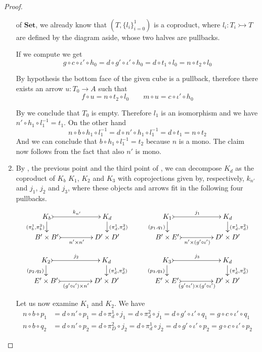 \documentclass[a4paper,UKenglish,cleveref,pdftex,thm-restate,numberwithinsect]{lipics-v2021}
\newcommand{\Set}{\mathbf{Set}}
\newcommand{\mto}{\rightarrowtail}
\begin{document}
\begin{proof}
\begin{enumerate}
		\noindent\parbox{9.5cm}{ of $\Set$, we already know that $(T, \{l_i\}_{i=0}^1)$ is a coproduct, where $l_i\colon T_i\mto T$ are defined by the diagram aside, whose two halves are pullbacks. }\hfill\parbox{4cm}{}
		
		If we compute we get
		\[g\circ c \circ \iota' \circ h_0=d\circ g'\circ \iota' \circ h_0=d\circ t_1\circ l_0=n\circ t_2\circ l_0\]
		
		By hypothesis the bottom face of the given cube is a pullback, therefore there exists an arrow $u\colon T_0\to A$ such that 
		\[f\circ u=n\circ t_2\circ l_0 \qquad m\circ u=c\circ \iota'\circ h_0\]
		
	By  we conclude that $T_0$ is empty. Therefore $l_1$ is an isomorphism and we have $n'\circ h_1\circ l^{-1}_1=t_1$. On the other hand
\[n\circ b\circ h_1\circ l^{-1}_1=d\circ n'\circ h_1\circ l^{-1}_1=d\circ t_1=n\circ t_2\]
And we can conclude that $b\circ h_1\circ l^{-1}_1=t_2$ because $n$ is a mono. The claim now follows from the fact that  also $n'$ is mono.
		
		\item 	 By , the previous point and the third point of , we can decompose $K_d$ as the coproduct of $K_b$ $K_1$, $K_2$ and $K_3$ with coprojections given by, respectively, $k_{n'}$ and $j_1$, $j_2$ and $j_3$, where these objects and arrows fit in the following four pullbacks.
		\[\xymatrix@C=45pt@R=15pt{K_b \ar@{>->}[r]^{k_{n'}}  \ar[d]_{(\pi^1_b, \pi^2_b)}& K_d   \ar[d]^{(\pi^1_d, \pi^2_d)}& K_1 \ar@{>->}[r]^{j_1}  \ar[d]_{(p_1, q_1)} & K_d \ar[d]^{(\pi^1_d, \pi^2_d)} \\
			B'\times B' \ar@{>->}[r]_-{n'\times n'} & D'\times D' & B'\times E' \ar@{>->}[r]_-{n'\times (g'\circ \iota')} & D'\times D'}\]
		\[ \xymatrix@C=45pt@R=15pt{K_2 \ar@{>->}[r]^{j_2}  \ar[d]_{(p_2, q_2)}& K_d   \ar[d]^{(\pi^1_d, \pi^2_d)}& K_3 \ar@{>->}[r]^{j_3}  \ar[d]_{(p_3, q_3)} & K_d \ar[d]^{(\pi^1_d, \pi^2_d)} \\
			E'\times B' \ar@{>->}[r]_-{(g'\circ \iota') \times n'} & D'\times D' & E'\times E' \ar@{>->}[r]_-{(g'\circ \iota')\times (g'\circ \iota')} & D'\times D'}\]

Let us now examine $K_1$ and $K_2$. We have
\begin{align*}
	n\circ b\circ p_1&=d\circ n'\circ p_1=d\circ \pi^1_d\circ j_1=d\circ \pi^2_d\circ j_1=d\circ g'\circ \iota'\circ q_1=g\circ c \circ \iota'\circ q_1\\
	n\circ b\circ q_2 &=d\circ n'\circ p_2=d\circ\pi^2_D\circ j_2
	=d\circ \pi^1_d\circ j_2=d\circ g'\circ \iota'\circ p_2 = g\circ c \circ \iota'\circ p_2
\end{align*}


\end{enumerate}
\end{proof}
\end{document}
